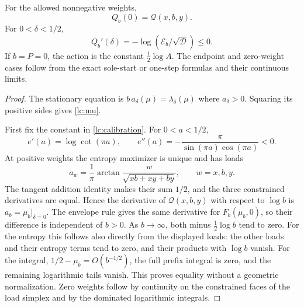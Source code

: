 \begin{lemma}\label{lc:action-identity}
For the allowed nonnegative weights,
\begin{equation}\label{lc:calibration}
                       Q_b(0)=\mathcal Q(x,b,y).
\end{equation}
For \(0<\delta<1/2\),
\begin{equation}\label{lc:action-derivative}
             Q_b'(\delta)=-\log(\mathcal E_b/\sqrt{\mathcal D})\le0.
\end{equation}
If \(b=P=0\), the action is the constant \(\frac12\log A\).
The endpoint and zero-weight cases follow from the exact sole-start
or one-step formulas and their continuous limits.
\end{lemma}
\begin{proof}
The stationary equation is
\(b\,a_\delta(\mu)=\lambda_\delta(\mu)\) where \(a_\delta>0\).
Squaring its positive sides gives \eqref{lc:mu}.

First fix the constant in \eqref{lc:calibration}. For \(0<a<1/2\),
\[
 e'(a)=\log\cot(\pi a),\qquad
 e''(a)=-\frac{\pi}{\sin(\pi a)\cos(\pi a)}<0.
\]
At positive weights the entropy maximizer is unique and has loads
\[
 a_w=\frac1\pi\arctan\frac{w}{\sqrt{xb+xy+by}},
                          \qquad w=x,b,y .
\]
The tangent addition identity makes their sum \(1/2\), and the
three constrained derivatives are equal. Hence the derivative
of \(\mathcal Q(x,b,y)\) with respect to \(\log b\) is
\(a_b=\mu_b|_{\delta=0}\). The envelope rule gives the same
derivative for \(F_b(\mu_b,0)\), so their difference is independent
of \(b>0\). As \(b\to\infty\), both minus \(\frac12\log b\)
tend to zero. For the entropy this follows also directly from the
displayed loads: the other loads and their entropy terms tend to zero,
and their products with \(\log b\) vanish. For the integral,
\(1/2-\mu_b=O(b^{-1/2})\), the full prefix integral is zero,
and the remaining logarithmic tails vanish.
This proves equality without a geometric normalization.
Zero weights follow by continuity on the constrained faces of
the load simplex and by the dominated logarithmic integrals.


\end{proof}
